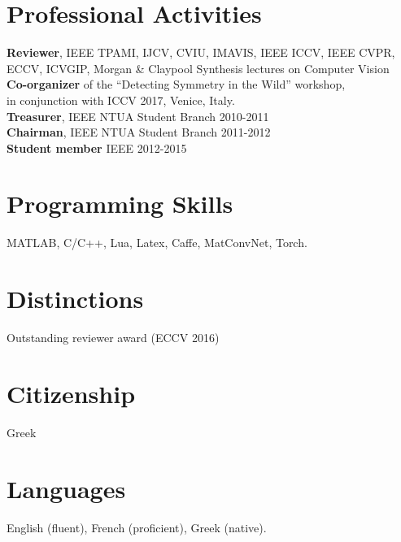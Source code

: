 \documentclass[margin]{res}
\begin{document}
\begin{resume}
\section{Professional Activities} 
	\textbf{Reviewer}, IEEE TPAMI, IJCV, CVIU, IMAVIS, IEEE ICCV, IEEE CVPR, ECCV, ICVGIP,
	Morgan \& Claypool Synthesis lectures on Computer Vision \\
	\textbf{Co-organizer} of the ``Detecting Symmetry in the Wild'' workshop, \\
	in conjunction with ICCV 2017, Venice, Italy. \\
	\textbf{Treasurer}, IEEE NTUA Student Branch \hfill 2010-2011 \\
	\textbf{Chairman}, IEEE NTUA Student Branch \hfill 2011-2012 \\
	\textbf{Student member} IEEE \hfill 2012-2015

\section{Programming Skills} MATLAB, C/C++, Lua, Latex, Caffe, MatConvNet, Torch. 
\newline

\section{Distinctions} Outstanding reviewer award (ECCV 2016)
\section{Citizenship} Greek
\section{Languages} English (fluent), French (proficient), Greek (native).
 
\end{resume}
\end{document}
